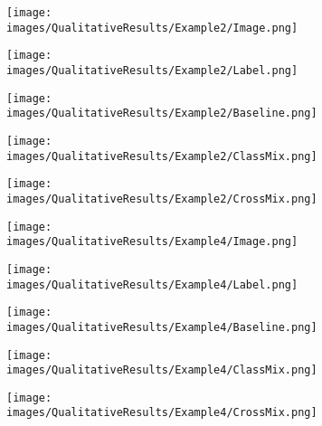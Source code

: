 \documentclass[10pt,twocolumn,letterpaper]{article}
\begin{document}
\begin{figure*}[th!]
    \begin{adjustbox}{width=1\textwidth}
    \begin{subfigure}[b]{\textwidth}
        \texttt{[image: images/QualitativeResults/Example2/Image.png]}
    \end{subfigure}
    \hspace{0.01cm}
    \begin{subfigure}[b]{\textwidth}
        \texttt{[image: images/QualitativeResults/Example2/Label.png]}
    \end{subfigure}
    \hspace{0.01cm}
    \begin{subfigure}[b]{\textwidth}
        \texttt{[image: images/QualitativeResults/Example2/Baseline.png]}
    \end{subfigure}
    \hspace{0.01cm}
    \begin{subfigure}[b]{\textwidth}
        \texttt{[image: images/QualitativeResults/Example2/ClassMix.png]}
    \end{subfigure}
    \hspace{0.01cm}
    \begin{subfigure}[b]{\textwidth}
        \texttt{[image: images/QualitativeResults/Example2/CrossMix.png]}
    \end{subfigure}
    \end{adjustbox}
    


    \begin{adjustbox}{width=1\textwidth}
    \begin{subfigure}[b]{\textwidth}
        \texttt{[image: images/QualitativeResults/Example4/Image.png]}
    \end{subfigure}
    \hspace{0.01cm}
    \begin{subfigure}[b]{\textwidth}
        \texttt{[image: images/QualitativeResults/Example4/Label.png]}
    \end{subfigure}
    \hspace{0.01cm}
    \begin{subfigure}[b]{\textwidth}
        \texttt{[image: images/QualitativeResults/Example4/Baseline.png]}
    \end{subfigure}
    \hspace{0.01cm}
    \begin{subfigure}[b]{\textwidth}
        \texttt{[image: images/QualitativeResults/Example4/ClassMix.png]}
    \end{subfigure}
    \hspace{0.01cm}
    \begin{subfigure}[b]{\textwidth}
        \texttt{[image: images/QualitativeResults/Example4/CrossMix.png]}
    \end{subfigure}
    \end{adjustbox}
    

\end{figure*}
\end{document}
